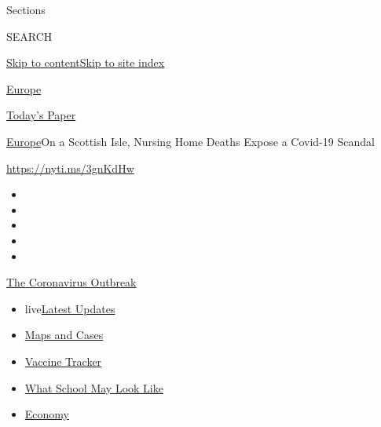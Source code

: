 Sections

SEARCH

\protect\hyperlink{site-content}{Skip to
content}\protect\hyperlink{site-index}{Skip to site index}

\href{https://www.nytimes.com/section/world/europe}{Europe}

\href{https://myaccount.nytimes.com/auth/login?response_type=cookie\&client_id=vi}{}

\href{https://www.nytimes.com/section/todayspaper}{Today's Paper}

\href{/section/world/europe}{Europe}\textbar{}On a Scottish Isle,
Nursing Home Deaths Expose a Covid-19 Scandal

\url{https://nyti.ms/3gnKdHw}

\begin{itemize}
\item
\item
\item
\item
\item
\end{itemize}

\href{https://www.nytimes.com/news-event/coronavirus?action=click\&pgtype=Article\&state=default\&region=TOP_BANNER\&context=storylines_menu}{The
Coronavirus Outbreak}

\begin{itemize}
\tightlist
\item
  live\href{https://www.nytimes.com/2020/08/01/world/coronavirus-covid-19.html?action=click\&pgtype=Article\&state=default\&region=TOP_BANNER\&context=storylines_menu}{Latest
  Updates}
\item
  \href{https://www.nytimes.com/interactive/2020/us/coronavirus-us-cases.html?action=click\&pgtype=Article\&state=default\&region=TOP_BANNER\&context=storylines_menu}{Maps
  and Cases}
\item
  \href{https://www.nytimes.com/interactive/2020/science/coronavirus-vaccine-tracker.html?action=click\&pgtype=Article\&state=default\&region=TOP_BANNER\&context=storylines_menu}{Vaccine
  Tracker}
\item
  \href{https://www.nytimes.com/interactive/2020/07/29/us/schools-reopening-coronavirus.html?action=click\&pgtype=Article\&state=default\&region=TOP_BANNER\&context=storylines_menu}{What
  School May Look Like}
\item
  \href{https://www.nytimes.com/live/2020/07/31/business/stock-market-today-coronavirus?action=click\&pgtype=Article\&state=default\&region=TOP_BANNER\&context=storylines_menu}{Economy}
\end{itemize}

